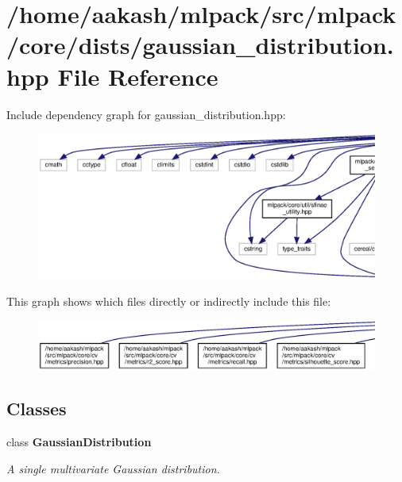 \section{/home/aakash/mlpack/src/mlpack/core/dists/gaussian\+\_\+distribution.hpp File Reference}
\label{gaussian__distribution_8hpp}
Include dependency graph for gaussian\+\_\+distribution.\+hpp\+:
\nopagebreak
\begin{figure}[H]
\begin{center}
\leavevmode
\includegraphics[width=350pt]{gaussian__distribution_8hpp__incl}
\end{center}
\end{figure}
This graph shows which files directly or indirectly include this file\+:
\nopagebreak
\begin{figure}[H]
\begin{center}
\leavevmode
\includegraphics[width=350pt]{gaussian__distribution_8hpp__dep__incl}
\end{center}
\end{figure}
\subsection*{Classes}
\begin{DoxyCompactItemize}
\item 
class \textbf{ Gaussian\+Distribution}
\begin{DoxyCompactList}\small\item\em A single multivariate Gaussian distribution. \end{DoxyCompactList}\end{DoxyCompactItemize}
